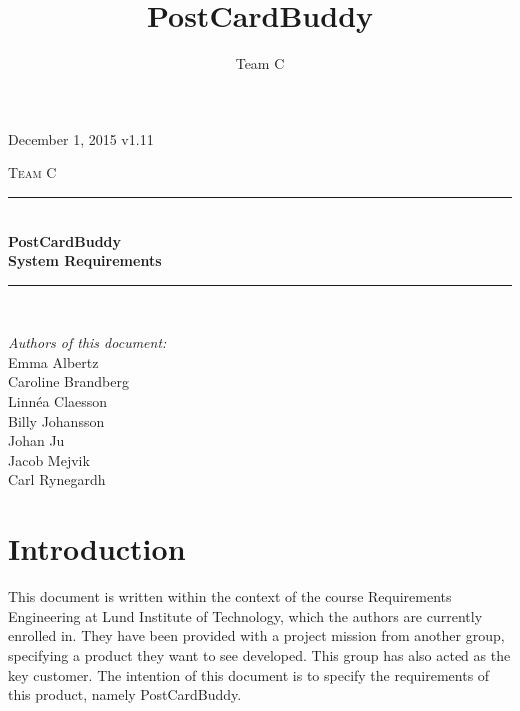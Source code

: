 \documentclass[10pt,a4paper]{article}
\title{PostCardBuddy}
\author{Team C}
\begin{document}
\begin{titlepage}
\newcommand{\HRule}{\rule{\linewidth}{0.5mm}}


\begin{flushright}
December 1, 2015 v1.11\\[3cm]
\end{flushright}


\centering
\textsc{\LARGE Team C}\\[0.5cm]

\HRule \\[0.4cm]
{ \huge \bfseries PostCardBuddy}\\[0.3cm]
{\Large \bfseries System Requirements}\\[0.4cm] %
\HRule \\[1.5cm]

\vfill
\begin{flushleft}
\textit{Authors of this document:}\\
Emma Albertz\\
Caroline Brandberg\\
Linnéa Claesson\\
Billy Johansson\\
Johan Ju\\
Jacob Mejvik\\
Carl Rynegardh
\end{flushleft}

\end{titlepage}



%



\setcounter{tocdepth}{2}
\tableofcontents
\newpage
{}

\section{Introduction}
This document is written within the context of the course Requirements Engineering at Lund Institute of Technology, which the authors are currently enrolled in. They have been provided with a project mission from another group, specifying a product they want to see developed. This group has also acted as the key customer. The intention of this document is to specify the requirements of this product, namely PostCardBuddy.
\end{document}
